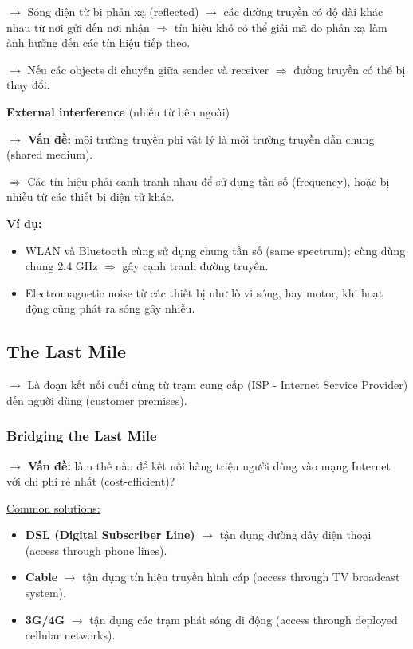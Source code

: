 \noindent
$\rightarrow$ Sóng điện từ bị phản xạ (reflected) $\rightarrow$ các đường truyền có độ dài khác nhau từ nơi gửi đến nơi nhận $\Rightarrow$ tín hiệu khó có thể giải mã do phản xạ làm ảnh hưởng đến các tín hiệu tiếp theo.

$\rightarrow$ Nếu các objects di chuyển giữa sender và receiver $\Rightarrow$ đường truyền có thể bị thay đổi.
\medskip

\noindent
\textbf{External interference} (nhiễu từ bên ngoài)
\medskip

\noindent
\textbf{$\rightarrow$ Vấn đề:} môi trường truyền phi vật lý là môi trường truyền dẫn chung (shared medium).

$\Rightarrow$ Các tín hiệu phải cạnh tranh nhau để sử dụng tần số (frequency), hoặc bị nhiễu từ các thiết bị điện tử khác.
\medskip

\noindent
\textbf{Ví dụ:}

\begin{itemize}
    \item WLAN và Bluetooth cùng sử dụng chung tần số (same spectrum); cùng dùng chung 2.4 GHz $\Rightarrow$ gây cạnh tranh đường truyền.
    \item Electromagnetic noise từ các thiết bị như lò vi sóng, hay motor, khi hoạt động cũng phát ra sóng gây nhiễu.
\end{itemize}
\medskip
\noindent

\subsection{The Last Mile}

$\rightarrow$ Là đoạn kết nối cuối cùng từ trạm cung cấp (ISP - Internet Service Provider) đến người dùng (customer premises).
\medskip

\subsubsection{Bridging the Last Mile}

\noindent
\textbf{$\rightarrow$ Vấn đề:} làm thế nào để kết nối hàng triệu người dùng vào mạng Internet với chi phí rẻ nhất (cost-efficient)?
\medskip

\noindent
\underline{Common solutions:}

\begin{itemize}
    \item \textbf{DSL (Digital Subscriber Line)} $\rightarrow$ tận dụng đường dây điện thoại (access through phone lines).
    \item \textbf{Cable} $\rightarrow$ tận dụng tín hiệu truyền hình cáp (access through TV broadcast system).
    \item \textbf{3G/4G} $\rightarrow$ tận dụng các trạm phát sóng di động (access through deployed cellular networks).
\end{itemize}
\medskip

